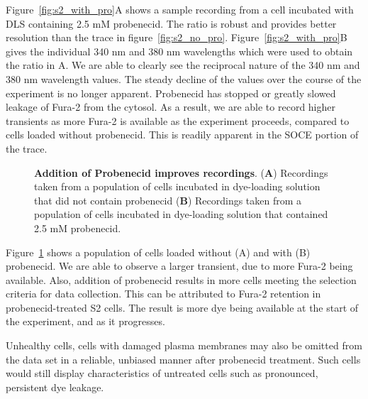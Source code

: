 Figure~\ref{fig:s2_with_pro}A shows a sample recording from a cell incubated with DLS containing 2.5 mM probenecid. The ratio is robust and provides better resolution than the trace in figure~\ref{fig:s2_no_pro}. Figure~\ref{fig:s2_with_pro}B gives the individual 340 nm and 380 nm wavelengths which were used to obtain the ratio in A. We are able to clearly see the reciprocal nature of the 340 nm and 380 nm wavelength values. The steady decline of the values over the course of the experiment is no longer apparent. Probenecid has stopped or greatly slowed leakage of Fura-2 from the cytosol. As a result, we are able to record higher \Ca{} transients as more Fura-2 is available as the experiment proceeds, compared to cells loaded without probenecid. This is readily apparent in the SOCE portion of the trace. 

\newpage

\begin{figure}[!ht]
\centering
{}
	
\caption[Addition of Probenecid improves \Ca{} recordings]{{\bfseries Addition of Probenecid improves \Ca{} recordings}. 
({\bfseries A}) Recordings taken from a population of cells incubated in dye-loading solution that did not contain probenecid ({\bfseries B}) Recordings taken from a population of cells incubated in dye-loading solution that contained 2.5 mM probenecid.}
\label{fig:s2_pro_compare}
\end{figure}

Figure~\ref{fig:s2_pro_compare} shows a population of cells loaded without (A) and with (B) probenecid. We are able to observe a larger \Ca{} transient, due to more Fura-2 being available. Also, addition of probenecid results in more cells meeting the selection criteria for data collection. This can be attributed to Fura-2 retention in probenecid-treated S2 cells. The result is more dye being available at the start of the experiment, and as it progresses. 

Unhealthy cells, cells with damaged plasma membranes may also be omitted from the data set in a reliable, unbiased manner after probenecid treatment. Such cells would still display characteristics of untreated cells such as pronounced, persistent dye leakage.

